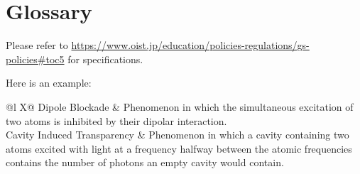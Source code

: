 \chapter*{Glossary}

Please refer to \url{https://www.oist.jp/education/policies-regulations/gs-policies#toc5} for specifications.

Here is an example:

\setlength\LTleft{0pt}
\setlength\LTright{0pt}
\begin{xltabular}{\textwidth}{@{}l X@{}}
    Dipole Blockade             & Phenomenon in which the simultaneous excitation of two atoms is inhibited by their dipolar interaction.                                                                                  \\
    Cavity Induced Transparency & Phenomenon in which a cavity containing two atoms excited with light at a frequency halfway between the atomic frequencies contains the number of photons an empty cavity would contain. \\
\end{xltabular}
